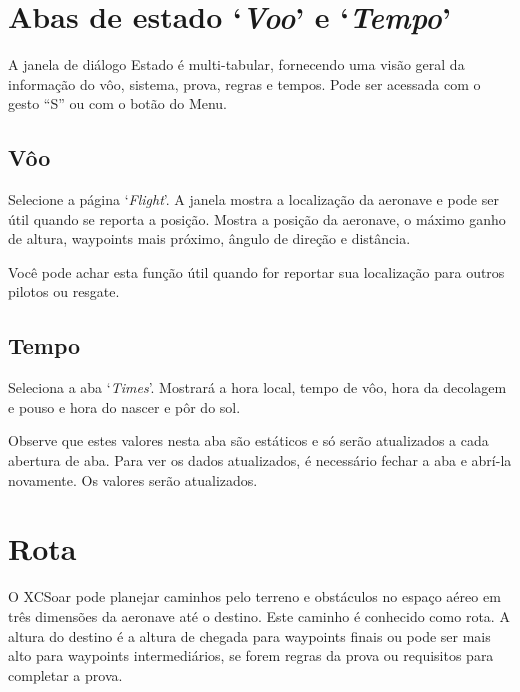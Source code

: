 \section{Abas de estado `{\it Voo}' e `{\it Tempo}'}\label{sec:flight-status}

A janela de diálogo Estado é multi-tabular, fornecendo uma visão geral da informação do vôo, sistema, prova, regras e tempos.  Pode ser acessada com o gesto “S” ou com o botão do Menu. 
\begin{quote}
\blink{}
\end{quote}

\subsection*{Vôo}
Selecione a página `{\it Flight}'. 
A janela mostra a localização da aeronave e pode ser útil quando se reporta a posição.  Mostra a posição da aeronave, o máximo ganho de altura, waypoints mais próximo, ângulo de direção e distância.

Você pode achar esta função útil quando for reportar sua localização para outros pilotos ou resgate.

\subsection*{Tempo}\label{sec:time-status}
Seleciona a aba  `{\it Times}'. 
Mostrará a hora local, tempo de vôo, hora da decolagem e pouso e hora do nascer e pôr do sol.

Observe que estes valores nesta aba são estáticos e só serão atualizados a cada abertura de aba. 
Para ver os dados atualizados, é necessário fechar a aba e abrí-la novamente.  Os valores serão atualizados. 


\section{Rota}\label{sec:route}

O XCSoar pode planejar caminhos pelo terreno e obstáculos no espaço aéreo em três dimensões da aeronave até o destino.  Este caminho é conhecido como rota.  A altura do destino é a altura de chegada para waypoints finais ou pode ser mais alto para waypoints intermediários, se forem regras da prova ou requisitos para completar a prova.  

